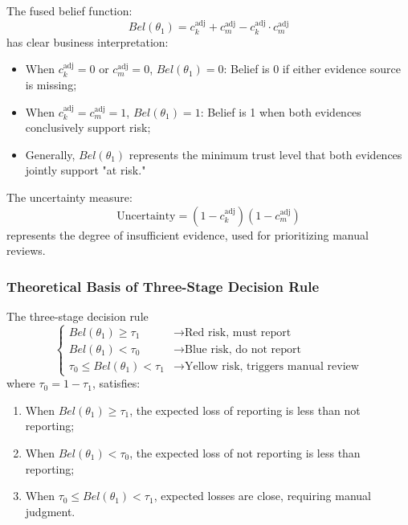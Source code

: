 \documentclass[11pt,a4paper]{report}
\begin{document}
The fused belief function:
\[
Bel(\theta_1) = c_k^{\text{adj}} + c_m^{\text{adj}} - c_k^{\text{adj}} \cdot c_m^{\text{adj}}
\]
has clear business interpretation:

\begin{itemize}
    \item When $c_k^{\text{adj}} = 0$ or $c_m^{\text{adj}} = 0$, $Bel(\theta_1) = 0$: Belief is 0 if either evidence source is missing;
    \item When $c_k^{\text{adj}} = c_m^{\text{adj}} = 1$, $Bel(\theta_1) = 1$: Belief is 1 when both evidences conclusively support risk;
    \item Generally, $Bel(\theta_1)$ represents the minimum trust level that both evidences jointly support "at risk."
\end{itemize}

The uncertainty measure:
\[
\mathrm{Uncertainty} = (1 - c_k^{\text{adj}})(1 - c_m^{\text{adj}})
\]
represents the degree of insufficient evidence, used for prioritizing manual reviews.

\subsubsection{Theoretical Basis of Three-Stage Decision Rule}

\begin{theorem}
The three-stage decision rule
\[
\begin{cases}
Bel(\theta_1) \geq \tau_1 & \rightarrow \text{Red risk, must report} \\
Bel(\theta_1) < \tau_0 & \rightarrow \text{Blue risk, do not report} \\
\tau_0 \leq Bel(\theta_1) < \tau_1 & \rightarrow \text{Yellow risk, triggers manual review}
\end{cases}
\]
where $\tau_0 = 1 - \tau_1$, satisfies:
\begin{enumerate}
    \item When $Bel(\theta_1) \geq \tau_1$, the expected loss of reporting is less than not reporting;
    \item When $Bel(\theta_1) < \tau_0$, the expected loss of not reporting is less than reporting;
    \item When $\tau_0 \leq Bel(\theta_1) < \tau_1$, expected losses are close, requiring manual judgment.
\end{enumerate}
\end{theorem}
\end{document}

